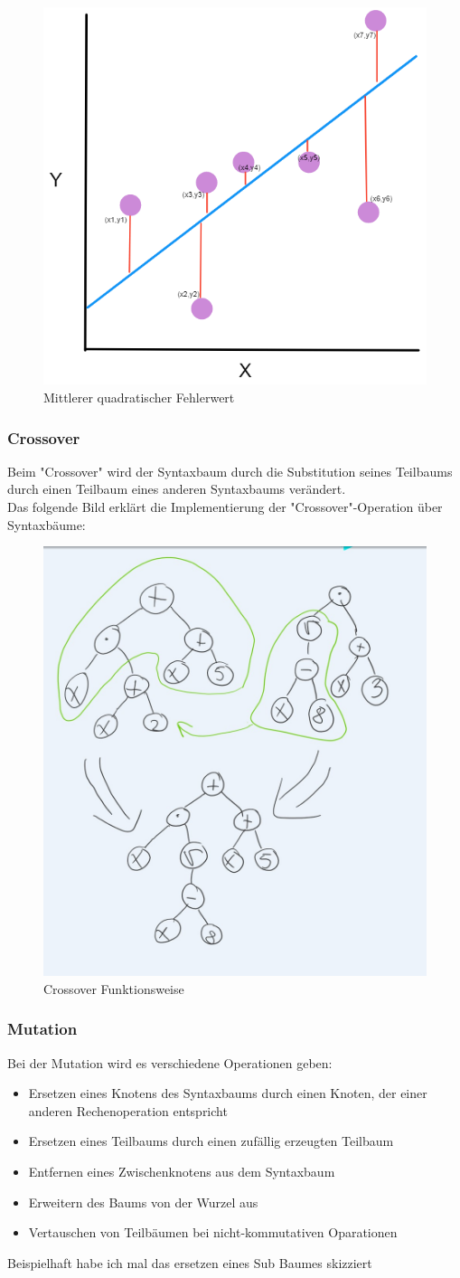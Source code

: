 \documentclass[ngerman]{article}
\begin{document}
\begin{figure}[h]
	\centering
	\includegraphics[width=0.4\linewidth]{mse.png}
	\caption{Mittlerer quadratischer Fehlerwert}
	\label{fig::mse}
\end{figure}
\newpage
\subsubsection{Crossover}
Beim "Crossover" wird der Syntaxbaum durch die Substitution seines Teilbaums durch einen Teilbaum eines anderen Syntaxbaums verändert.
\\
Das folgende Bild erklärt die Implementierung der "Crossover"-Operation über Syntaxbäume:


\begin{figure}[h]
	\centering
	\includegraphics[width=0.25\linewidth]{crossover.jpg}
	\caption{Crossover Funktionsweise}
	\label{fig::cross}
\end{figure}

\subsubsection{Mutation}
Bei der Mutation wird es verschiedene Operationen geben:
\begin{itemize}
	\item Ersetzen eines Knotens des Syntaxbaums durch einen Knoten, der einer anderen Rechenoperation entspricht
	\item Ersetzen eines Teilbaums durch einen zufällig erzeugten Teilbaum
\item Entfernen eines Zwischenknotens aus dem Syntaxbaum
\item Erweitern des Baums von der Wurzel aus
\item Vertauschen von Teilbäumen bei nicht-kommutativen Oparationen

\end{itemize}
Beispielhaft habe ich mal das ersetzen eines Sub Baumes skizziert
\end{document}
